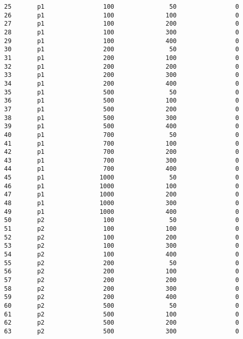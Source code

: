 \documentclass[11pt]{article}
\begin{document}
\begin{Verbatim}[commandchars=\\\{\}]
25       p1                100               50                0   
26       p1                100              100                0   
27       p1                100              200                0   
28       p1                100              300                0   
29       p1                100              400                0   
30       p1                200               50                0   
31       p1                200              100                0   
32       p1                200              200                0   
33       p1                200              300                0   
34       p1                200              400                0   
35       p1                500               50                0   
36       p1                500              100                0   
37       p1                500              200                0   
38       p1                500              300                0   
39       p1                500              400                0   
40       p1                700               50                0   
41       p1                700              100                0   
42       p1                700              200                0   
43       p1                700              300                0   
44       p1                700              400                0   
45       p1               1000               50                0   
46       p1               1000              100                0   
47       p1               1000              200                0   
48       p1               1000              300                0   
49       p1               1000              400                0   
50       p2                100               50                0   
51       p2                100              100                0   
52       p2                100              200                0   
53       p2                100              300                0   
54       p2                100              400                0   
55       p2                200               50                0   
56       p2                200              100                0   
57       p2                200              200                0   
58       p2                200              300                0   
59       p2                200              400                0   
60       p2                500               50                0   
61       p2                500              100                0   
62       p2                500              200                0   
63       p2                500              300                0   

\end{Verbatim}
\end{document}
